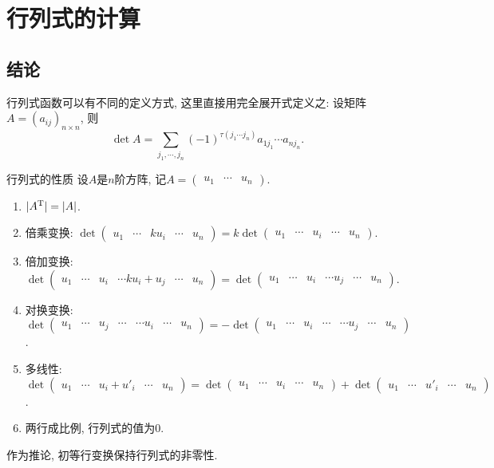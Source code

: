 \section{行列式的计算}

\subsection*{结论}

行列式函数可以有不同的定义方式, 这里直接用完全展开式定义之: 设矩阵$A=(a_{ij})_{n\times n}$, 则$$\det A = \sum_{j_1,\cdots ,j_n} (-1)^{\tau (j_1\cdots j_n)} a_{1j_1} \cdots a_{nj_n}. $$

\begin{proposition}{行列式的性质}
	设$A$是$n$阶方阵, 记$A=\begin{pmatrix}
		u_1 & \cdots & u_n
	\end{pmatrix}$. 
	\begin{enumerate}
		\item $|A^{\operatorname{T}}| = |A|$. 
		\item 倍乘变换: $\det \begin{pmatrix}
		u_1 & \cdots & ku_i & \cdots & u_n
	\end{pmatrix} = k \det \begin{pmatrix}
		u_1 & \cdots & u_i & \cdots & u_n
	\end{pmatrix}$. 
		\item 倍加变换: $\det \begin{pmatrix}
		u_1 & \cdots & u_i & \cdots ku_i+u_j & \cdots & u_n
	\end{pmatrix} = \det \begin{pmatrix}
		u_1 & \cdots & u_i & \cdots u_j & \cdots & u_n
	\end{pmatrix}$. 
		\item 对换变换: $\det \begin{pmatrix}
		u_1 & \cdots & u_j & \cdots & \cdots u_i & \cdots & u_n
	\end{pmatrix} = -\det \begin{pmatrix}
		u_1 & \cdots & u_i & \cdots & \cdots u_j & \cdots & u_n
	\end{pmatrix}$. 
		\item 多线性: $\det \begin{pmatrix}
			u_1 & \cdots & u_i+u'_i & \cdots & u_n
		\end{pmatrix} = \det \begin{pmatrix}
			u_1 & \cdots & u_i & \cdots & u_n
		\end{pmatrix} + \det \begin{pmatrix}
			u_1 & \cdots & u'_i & \cdots & u_n
		\end{pmatrix}$. 
		\item 两行成比例, 行列式的值为$0$. 
	\end{enumerate}
\end{proposition}
\begin{remark}
	作为推论, 初等行变换保持行列式的非零性. 
\end{remark}


